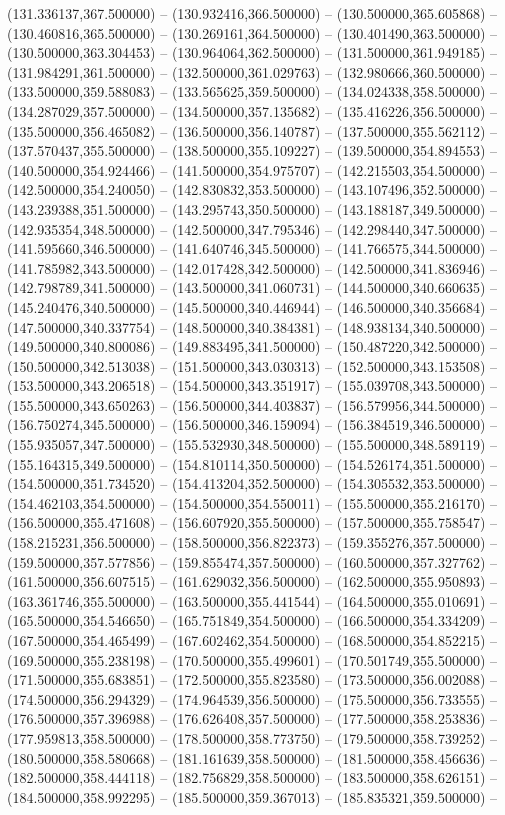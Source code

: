 (131.336137,367.500000) -- (130.932416,366.500000) -- (130.500000,365.605868) -- (130.460816,365.500000) -- (130.269161,364.500000) -- (130.401490,363.500000) -- (130.500000,363.304453) -- (130.964064,362.500000) -- (131.500000,361.949185) -- (131.984291,361.500000) -- (132.500000,361.029763) -- (132.980666,360.500000) -- (133.500000,359.588083) -- (133.565625,359.500000) -- (134.024338,358.500000) -- (134.287029,357.500000) -- (134.500000,357.135682) -- (135.416226,356.500000) -- (135.500000,356.465082) -- (136.500000,356.140787) -- (137.500000,355.562112) -- (137.570437,355.500000) -- (138.500000,355.109227) -- (139.500000,354.894553) -- (140.500000,354.924466) -- (141.500000,354.975707) -- (142.215503,354.500000) -- (142.500000,354.240050) -- (142.830832,353.500000) -- (143.107496,352.500000) -- (143.239388,351.500000) -- (143.295743,350.500000) -- (143.188187,349.500000) -- (142.935354,348.500000) -- (142.500000,347.795346) -- (142.298440,347.500000) -- (141.595660,346.500000) -- (141.640746,345.500000) -- (141.766575,344.500000) -- (141.785982,343.500000) -- (142.017428,342.500000) -- (142.500000,341.836946) -- (142.798789,341.500000) -- (143.500000,341.060731) -- (144.500000,340.660635) -- (145.240476,340.500000) -- (145.500000,340.446944) -- (146.500000,340.356684) -- (147.500000,340.337754) -- (148.500000,340.384381) -- (148.938134,340.500000) -- (149.500000,340.800086) -- (149.883495,341.500000) -- (150.487220,342.500000) -- (150.500000,342.513038) -- (151.500000,343.030313) -- (152.500000,343.153508) -- (153.500000,343.206518) -- (154.500000,343.351917) -- (155.039708,343.500000) -- (155.500000,343.650263) -- (156.500000,344.403837) -- (156.579956,344.500000) -- (156.750274,345.500000) -- (156.500000,346.159094) -- (156.384519,346.500000) -- (155.935057,347.500000) -- (155.532930,348.500000) -- (155.500000,348.589119) -- (155.164315,349.500000) -- (154.810114,350.500000) -- (154.526174,351.500000) -- (154.500000,351.734520) -- (154.413204,352.500000) -- (154.305532,353.500000) -- (154.462103,354.500000) -- (154.500000,354.550011) -- (155.500000,355.216170) -- (156.500000,355.471608) -- (156.607920,355.500000) -- (157.500000,355.758547) -- (158.215231,356.500000) -- (158.500000,356.822373) -- (159.355276,357.500000) -- (159.500000,357.577856) -- (159.855474,357.500000) -- (160.500000,357.327762) -- (161.500000,356.607515) -- (161.629032,356.500000) -- (162.500000,355.950893) -- (163.361746,355.500000) -- (163.500000,355.441544) -- (164.500000,355.010691) -- (165.500000,354.546650) -- (165.751849,354.500000) -- (166.500000,354.334209) -- (167.500000,354.465499) -- (167.602462,354.500000) -- (168.500000,354.852215) -- (169.500000,355.238198) -- (170.500000,355.499601) -- (170.501749,355.500000) -- (171.500000,355.683851) -- (172.500000,355.823580) -- (173.500000,356.002088) -- (174.500000,356.294329) -- (174.964539,356.500000) -- (175.500000,356.733555) -- (176.500000,357.396988) -- (176.626408,357.500000) -- (177.500000,358.253836) -- (177.959813,358.500000) -- (178.500000,358.773750) -- (179.500000,358.739252) -- (180.500000,358.580668) -- (181.161639,358.500000) -- (181.500000,358.456636) -- (182.500000,358.444118) -- (182.756829,358.500000) -- (183.500000,358.626151) -- (184.500000,358.992295) -- (185.500000,359.367013) -- (185.835321,359.500000) -- 